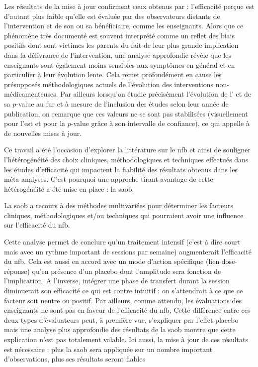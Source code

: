 Les résultats de la mise à jour confirment ceux obtenus par \citet{Cortese2016} : 
l'efficacité perçue est d'autant plus faible qu'elle est évaluée par 
des observateurs distants de l'intervention et de son ou sa bénéficiaire, comme les enseignants. Alors que ce phénomène très documenté est souvent 
interprété comme un reflet des biais positifs dont sont victimes les parents du fait de leur plus grande implication dans la délivrance de 
l'intervention, une analyse approfondie révèle que les enseignants sont également moins sensibles aux symptômes en général et en particulier 
à leur évolution lente. 
Cela remet profondément en cause les présupposés méthodologiques actuels de l'évolution des interventions non-médicamenteuses. Par ailleurs
lorsqu'on étudie précisément l'évolution de l' et de sa $p$-value au fur et à mesure de l'inclusion des études selon leur année de publication, 
on remarque que ces valeurs ne se sont pas stabilisées (visuellement pour l'\gls{est} et pour la $p$-value grâce à son intervalle de confiance), 
ce qui appelle à de nouvelles mises à jour.

Ce travail a été l'occasion d'explorer 
la littérature sur le \gls{nfb} et ainsi de souligner l'hétérogénéité des choix cliniques, méthodologiques et techniques effectués dans les études 
d'efficacité qui impactent la fiabilité
des résultats obtenus dans les méta-analyses. C'est pourquoi une approche tirant avantage de cette hétérogénéité a été mise en place : la \gls{saob}.

La \gls{saob} a recours à des méthodes multivariées pour déterminer les facteurs cliniques, méthodologiques et/ou techniques qui pourraient avoir une 
influence sur l'efficacité du \gls{nfb}. 

Cette analyse permet de conclure qu'un traitement intensif (c'est à dire court mais avec un rythme important de sessions par semaine) augmenterait 
l'efficacité du \gls{nfb}. Cela est aussi en accord avec un mode d'action spécifique (lien dose-réponse) qu'en présence d'un placebo dont l'amplitude 
sera fonction de l'implication. A l'inverse,  
intégrer une phase de transfert durant la session diminuerait son efficacité ce qui est contre intuitif : on s'attendrait à ce que ce facteur 
soit neutre ou positif. Par ailleurs, comme attendu, les évaluations des enseignants ne sont pas en faveur de l'efficacité du \gls{nfb},
Cette différence entre ces deux types d'évaluateurs peut, à première vue, s'expliquer par l'effet placebo mais une analyse plus approfondie des 
résultats de la \gls{saob} montre que cette explication n'est pas totalement valable. 
Ici aussi, la mise à jour de ces résultats est nécessaire : plus la \gls{saob} sera appliquée sur un nombre important d'observations,
plus ses résultats seront fiables

